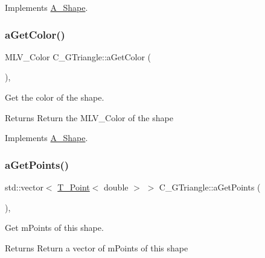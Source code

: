 Implements \hyperlink{classA__Shape_a1b142ee2d873d6c217f65de1632e7b6e}{A\+\_\+\+Shape}.

\mbox{\label{classC__GTriangle_a19100d603f9239fd66f1115c4358f0fc}} 
\subsubsection{\texorpdfstring{a\+Get\+Color()}{aGetColor()}}
{\footnotesize\ttfamily M\+L\+V\+\_\+\+Color C\+\_\+\+G\+Triangle\+::a\+Get\+Color (\begin{DoxyParamCaption}{ }\end{DoxyParamCaption})\hspace{0.3cm}{\ttfamily [override]}, {\ttfamily [virtual]}}



Get the color of the shape. 

\begin{DoxyReturn}{Returns}
Return the M\+L\+V\+\_\+\+Color of the shape 
\end{DoxyReturn}


Implements \hyperlink{classA__Shape_a1e90c8132d33e4ac84d42f72606193b2}{A\+\_\+\+Shape}.

\mbox{\label{classC__GTriangle_af3c514a6f5516c297374004a94788877}} 
\subsubsection{\texorpdfstring{a\+Get\+Points()}{aGetPoints()}}
{\footnotesize\ttfamily std\+::vector$<$ \hyperlink{classT__Point}{T\+\_\+\+Point}$<$ double $>$ $>$ C\+\_\+\+G\+Triangle\+::a\+Get\+Points (\begin{DoxyParamCaption}{ }\end{DoxyParamCaption})\hspace{0.3cm}{\ttfamily [override]}, {\ttfamily [virtual]}}



Get m\+Points of this shape. 

\begin{DoxyReturn}{Returns}
Return a vector of m\+Points of this shape 
\end{DoxyReturn}


